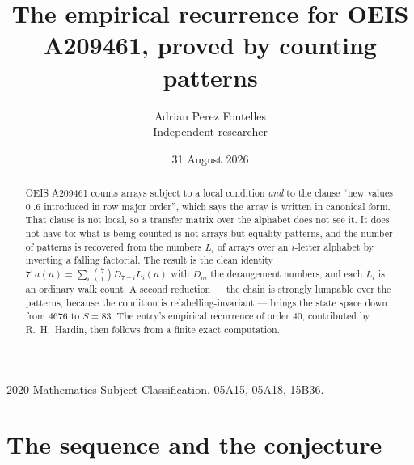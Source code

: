 \documentclass[11pt,a4paper]{article}
\title{The empirical recurrence for OEIS A209461, proved by counting patterns}
\author{Adrian Perez Fontelles\\ \small Independent researcher}
\date{31 August 2026}
\theoremstyle{plain}
\theoremstyle{definition}
\begin{document}
\maketitle

\begin{abstract}
OEIS A209461 counts arrays subject to a local condition \emph{and} to the clause ``new values
$0..6$ introduced in row major order'', which says the array is written in canonical
form. That clause is not local, so a transfer matrix over the alphabet does not see it. It
does not have to: what is being counted is not arrays but equality patterns, and the number
of patterns is recovered from the numbers $L_i$ of arrays over an $i$-letter alphabet by
inverting a falling factorial. The result is the clean identity
$7!\,a(n)=\sum_i\binom{7}{i}D_{7-i}L_i(n)$ with $D_m$ the derangement numbers,
and each $L_i$ is an ordinary walk count. A second reduction --- the chain is strongly
lumpable over the patterns, because the condition is relabelling-invariant --- brings the
state space down from $4676$ to $S=83$. The entry's empirical recurrence of order
$40$, contributed by R.~H.~Hardin, then follows from a finite exact computation.
\end{abstract}

\noindent\small 2020 Mathematics Subject Classification. 05A15, 05A18, 15B36.\normalsize

\section{The sequence and the conjecture}
\end{document}
